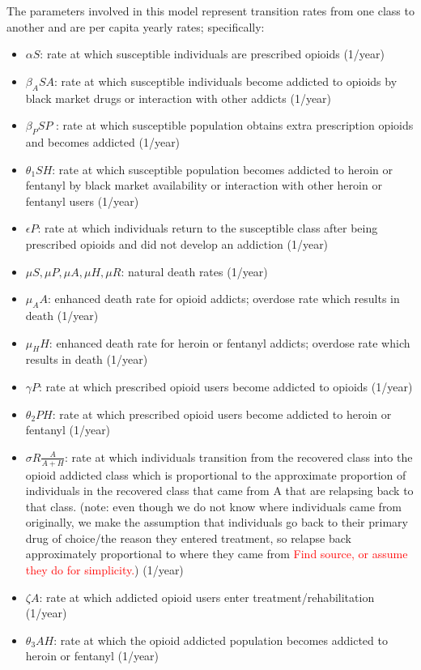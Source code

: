 \documentclass[12pt]{article}
\begin{document}
The parameters involved in this model represent transition rates from one class to another and are per capita yearly rates; specifically: 
\begin{itemize}
\item $\alpha S$: rate at which susceptible individuals are prescribed opioids (1/year)
\item $\beta_{A} SA$: rate at which susceptible individuals become addicted to opioids by black market drugs or interaction with other addicts (1/year)
\item $\beta_{P} SP$ : rate at which susceptible population obtains extra prescription opioids and becomes addicted  (1/year)
\item $\theta_1 SH$: rate at which susceptible population becomes addicted to heroin or fentanyl by black market availability or interaction with other heroin or fentanyl users  (1/year)
\item $\epsilon P$: rate at which individuals return to the susceptible class after being prescribed opioids and did not develop an addiction (1/year) 
\item $\mu S, \mu P, \mu A, \mu H, \mu R$: natural death rates (1/year)
\item $\mu_A A$: enhanced death rate for opioid addicts; overdose rate which results in death (1/year)
\item $\mu_H H$: enhanced death rate for heroin or fentanyl addicts; overdose rate which results in death (1/year)
\item $\gamma P$: rate at which prescribed opioid users become addicted to opioids (1/year)
\item $\theta_2 PH$: rate at which prescribed opioid users become addicted to heroin or fentanyl (1/year)
\item $\sigma R \frac{A}{A+H}$: rate at which individuals transition from the recovered class into the opioid addicted class which is proportional to the approximate proportion of individuals in the recovered class that came from A that are relapsing back to that class. (note: even though we do not know where individuals came from originally, we make the assumption that individuals go back to their primary drug of choice/the reason they entered treatment, so relapse back approximately proportional to where they came from \textcolor{red}{Find source, or assume they do for simplicity.}) (1/year)
\item $\zeta A$: rate at which addicted opioid users enter treatment/rehabilitation (1/year)
\item $\theta_3 AH$: rate at which the opioid addicted population becomes addicted to heroin or fentanyl  (1/year)

\end{itemize}
\end{document}
